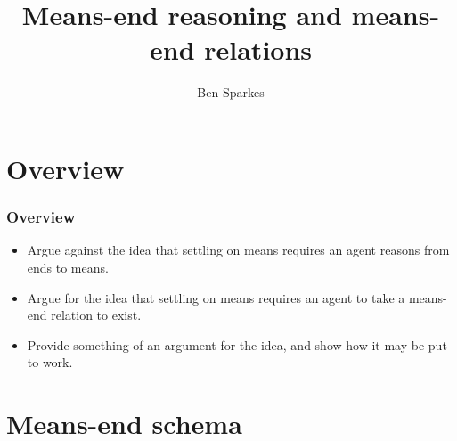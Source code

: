 \documentclass[noamssymb, compress, handout]{beamer} %
\title{Means-end reasoning and means-end relations}
\author{Ben Sparkes}
\begin{document}
\begin{frame}[noframenumbering]
  \titlepage
\end{frame}


\section*{Overview}
\label{sec:overview}

\begin{frame}
  \frametitle{Overview}

  \begin{itemize}
  \item Argue against the idea that settling on means requires an agent reasons from ends to means.
  \item Argue for the idea that settling on means requires an agent to take a means-end relation to exist.
  \end{itemize}

  \begin{itemize}
  \item Provide something of an argument for the idea, and show how it may be put to work.
  \end{itemize}
\end{frame}


\section{Means-end schema}
\label{sec:schema}






\end{document}
